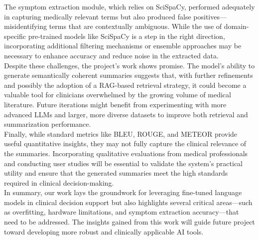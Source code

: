 The symptom extraction module, which relies on SciSpaCy, performed adequately in capturing medically relevant terms but also produced false positives—misidentifying terms that are contextually ambiguous. While the use of domain-specific pre-trained models like SciSpaCy is a step in the right direction, incorporating additional filtering mechanisms or ensemble approaches may be necessary to enhance accuracy and reduce noise in the extracted data.\\
Despite these challenges, the project's work shows promise. The model’s ability to generate semantically coherent summaries suggests that, with further refinements and possibly the adoption of a RAG-based retrieval strategy, it could become a valuable tool for clinicians overwhelmed by the growing volume of medical literature. Future iterations might benefit from experimenting with more advanced LLMs and larger, more diverse datasets to improve both retrieval and summarization performance.\\
Finally, while standard metrics like BLEU, ROUGE, and METEOR provide useful quantitative insights, they may not fully capture the clinical relevance of the summaries. Incorporating qualitative evaluations from medical professionals and conducting user studies will be essential to validate the system’s practical utility and ensure that the generated summaries meet the high standards required in clinical decision-making.\\
In summary, our work lays the groundwork for leveraging fine-tuned language models in clinical decision support but also highlights several critical areas—such as overfitting, hardware limitations, and symptom extraction accuracy—that need to be addressed. The insights gained from this work will guide future project toward developing more robust and clinically applicable AI tools.